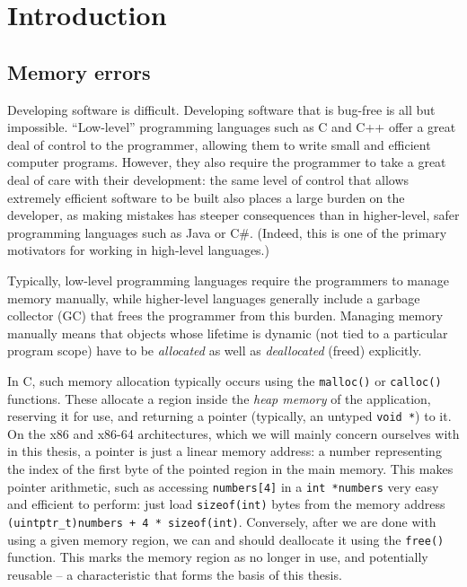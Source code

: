 \chapter{Introduction}
\label{ch:intro}

\section{Memory errors}

Developing software is difficult. Developing software that is bug-free is all but impossible. ``Low-level'' programming languages such as C and C++ offer a great deal of control to the programmer, allowing them to write small and efficient computer programs. However, they also require the programmer to take a great deal of care with their development: the same level of control that allows extremely efficient software to be built also places a large burden on the developer, as making mistakes has steeper consequences than in higher-level, safer programming languages such as Java or C\#. (Indeed, this is one of the primary motivators for working in high-level languages.)

Typically, low-level programming languages require the programmers to manage memory manually, while higher-level languages generally include a garbage collector (GC) that frees the programmer from this burden. Managing memory manually means that objects whose lifetime is dynamic (not tied to a particular program scope) have to be \emph{allocated} as well as \emph{deallocated} (freed) explicitly.

In C, such memory allocation typically occurs using the \lstinline!malloc()! or \lstinline!calloc()! functions. These allocate a region inside the \emph{heap memory} of the application, reserving it for use, and returning a pointer (typically, an untyped \lstinline!void *!) to it. On the x86 and x86-64 architectures, which we will mainly concern ourselves with in this thesis, a pointer is just a linear memory address: a number representing the index of the first byte of the pointed region in the main memory. This makes pointer arithmetic, such as accessing \lstinline!numbers[4]! in a \lstinline!int *numbers! very easy and efficient to perform: just load \lstinline!sizeof(int)! bytes from the memory address \lstinline!(uintptr_t)numbers + 4 * sizeof(int)!. Conversely, after we are done with using a given memory region, we can and should deallocate it using the \lstinline!free()! function. This marks the memory region as no longer in use, and potentially reusable -- a characteristic that forms the basis of this thesis.

